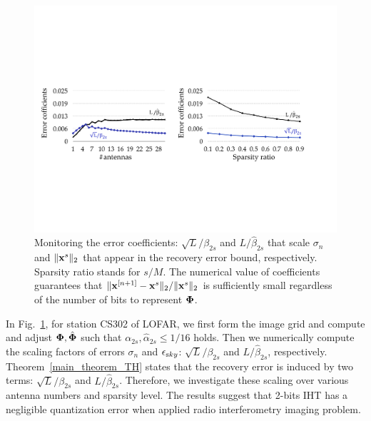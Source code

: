 \documentclass{article}
\begin{document}
 
 
 
\begin{figure}[t!]
\centering
\includegraphics[width=0.88\columnwidth, angle=0]{figs/beta_k.pdf}
\caption{Monitoring the error coefficients: $\sqrt{L}/\beta_{2s}$ and $L/\hat{\beta}_{2s}$ that scale $ \sigma_n$ and $\|{\bf x}^s \|_2$ that appear in the recovery error bound, respectively. Sparsity ratio stands for $s/M$. The numerical value of coefficients guarantees that $\|{\bf x}^{[n+1]}-{\bf x}^s\|_2/\|{\bf x}^s \|_2$ is sufficiently small regardless of the number of bits to represent ${\bf \Phi}$.}
\label{fig:beta}
\end{figure}

In Fig.~\ref{fig:beta}, for station CS302 of LOFAR, we first form the image grid and compute and adjust ${\bf \Phi}, \hat{\bf \Phi}$ such that $\alpha_{2s}, \hat{\alpha}_{2s}\leq 1/16$ holds. Then we numerically compute the scaling factors of errors $\sigma_n$ and ${\epsilon}_{\textrm sky}$: $\sqrt{L}/\beta_{2s}$ and ${L}/{\hat{\beta}_{2s}}$, respectively. Theorem~\ref{main_theorem_TH} states that the recovery error is induced by two terms: $\sqrt{L}/\beta_{2s}$ and $L/\hat{\beta}_{2s}$. Therefore, we investigate these scaling over various antenna numbers and sparsity level. The results suggest that 2-bits IHT has a negligible quantization error when applied radio interferometry imaging problem.
\end{document}
